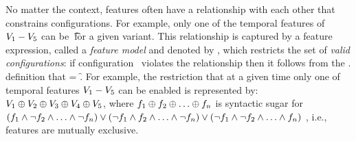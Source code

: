 No matter the context, features often have a relationship with each other that
constrains configurations. For example, only one of the temporal features of $\vOne - \vFive$
can be \t\ for a given variant.
This relationship is captured by a feature expression, called a \emph{feature model} and
denoted by \fModel,
which restricts the set of \emph{valid configurations}:
if configuration \config\ violates the relationship then 
it follows from the \fSem . definition that \fSem \fModel = \f.
For example, the restriction that at a given time only one of temporal features $\vOne - \vFive$
can be enabled is represented by:
\ensuremath{
\vOne \oplus \vTwo \oplus \vThree \oplus \vFour \oplus \vFive
},
where $\A \oplus \B \oplus \ldots \oplus \fName_n$ is syntactic sugar for $(\A \wedge \neg \B \wedge \ldots \wedge \neg \fName_n) \vee (\neg \A \wedge \B \wedge \ldots \wedge \neg \fName_n) \vee (\neg \A \wedge \neg \B \wedge \ldots \wedge \fName_n)$
, i.e., features are mutually exclusive.







